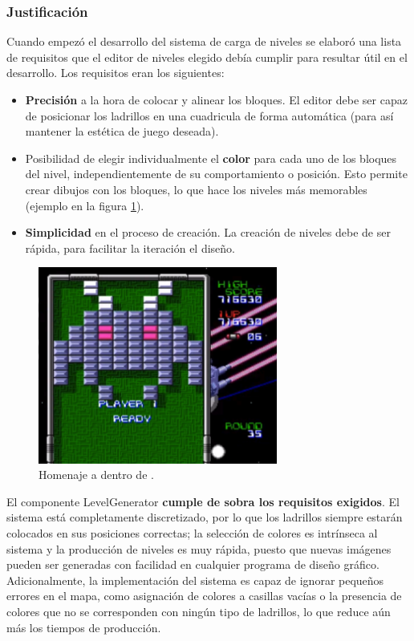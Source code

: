 \subsubsection{Justificación}
Cuando empezó el desarrollo del sistema de carga de niveles se elaboró una lista de requisitos que el editor de niveles elegido debía cumplir para resultar útil en el desarrollo. Los requisitos eran los siguientes:
\begin{itemize}
  \item \textbf{Precisión} a la hora de colocar y alinear los bloques. El editor debe ser capaz de posicionar los ladrillos en una cuadricula de forma automática (para así mantener la estética de juego deseada).
  \item Posibilidad de elegir individualmente el \textbf{color} para cada uno de los bloques del nivel, independientemente de su comportamiento o posición. Esto permite crear dibujos con los bloques, lo que hace los niveles más memorables (ejemplo en la figura \ref{ejemplo-arkanoid}). 
  \item \textbf{Simplicidad} en el proceso de creación. La creación de niveles debe de ser rápida, para facilitar la iteración el diseño.
\end{itemize}
\begin{figure}[h]
	\includegraphics[width=0.7\textwidth]{images/estructura/niveles/ejemplo-arkanoid}
	\centering
	\caption{Homenaje a  dentro de .}
	\label{ejemplo-arkanoid}
\end{figure}

El componente LevelGenerator \textbf{cumple de sobra los requisitos exigidos}. El sistema está completamente discretizado, por lo que los ladrillos siempre estarán colocados en sus posiciones correctas; la selección de colores es intrínseca al sistema y la producción de niveles es muy rápida, puesto que nuevas imágenes pueden ser generadas con facilidad en cualquier programa de diseño gráfico. Adicionalmente, la implementación del sistema es capaz de ignorar pequeños errores en el mapa, como asignación de colores a casillas vacías o la presencia de colores que no se corresponden con ningún tipo de ladrillos, lo que reduce aún más los tiempos de producción.

